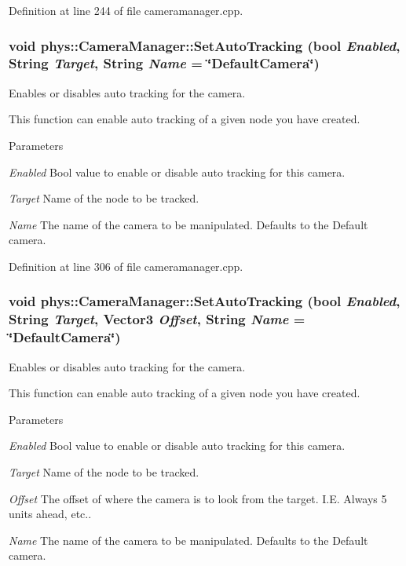 Definition at line 244 of file cameramanager.cpp.

\hypertarget{classphys_1_1CameraManager_a6edd94b6e8d9f2fa1e0b84554b367933}{
\subsubsection[{SetAutoTracking}]{\setlength{\rightskip}{0pt plus 5cm}void phys::CameraManager::SetAutoTracking (bool {\em Enabled}, \/  {\bf String} {\em Target}, \/  {\bf String} {\em Name} = {\ttfamily \char`\"{}DefaultCamera\char`\"{}})}}
\label{d9/d91/classphys_1_1CameraManager_a6edd94b6e8d9f2fa1e0b84554b367933}


Enables or disables auto tracking for the camera. 

This function can enable auto tracking of a given node you have created. 
\begin{DoxyParams}{Parameters}
\item[{\em Enabled}]Bool value to enable or disable auto tracking for this camera. \item[{\em Target}]Name of the node to be tracked. \item[{\em Name}]The name of the camera to be manipulated. Defaults to the Default camera. \end{DoxyParams}


Definition at line 306 of file cameramanager.cpp.

\hypertarget{classphys_1_1CameraManager_a43d55c71817096add5dad1552239fc74}{
\subsubsection[{SetAutoTracking}]{\setlength{\rightskip}{0pt plus 5cm}void phys::CameraManager::SetAutoTracking (bool {\em Enabled}, \/  {\bf String} {\em Target}, \/  {\bf Vector3} {\em Offset}, \/  {\bf String} {\em Name} = {\ttfamily \char`\"{}DefaultCamera\char`\"{}})}}
\label{d9/d91/classphys_1_1CameraManager_a43d55c71817096add5dad1552239fc74}


Enables or disables auto tracking for the camera. 

This function can enable auto tracking of a given node you have created. 
\begin{DoxyParams}{Parameters}
\item[{\em Enabled}]Bool value to enable or disable auto tracking for this camera. \item[{\em Target}]Name of the node to be tracked. \item[{\em Offset}]The offset of where the camera is to look from the target. I.E. Always 5 units ahead, etc.. \item[{\em Name}]The name of the camera to be manipulated. Defaults to the Default camera. \end{DoxyParams}



